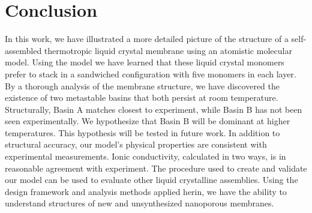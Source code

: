 \section{Conclusion}

In this work, we have illustrated a more detailed picture of the structure 
of a self-assembled thermotropic liquid crystal membrane using an atomistic 
molecular model. Using the model we have learned that these liquid crystal
monomers prefer to stack in a sandwiched configuration with five monomers
in each layer. By a thorough analysis of the membrane structure, we have
discovered the existence of two metastable basins that both persist at room
temperature. Structurally, Basin A matches closest to experiment, while 
Basin B has not been seen experimentally. We hypothesize that Basin B will
be dominant at higher temperatures. This hypothesis will be tested in future 
work. In addition to structural accuracy, our model's physical properties
are consistent with experimental measurements. Ionic conductivity, calculated
in two ways, is in reasonable agreement with experiment. The procedure used
to create and validate our model can be used to evaluate other liquid 
crystalline assemblies. Using the design framework and analysis methods 
applied herin, we have the ability to understand structures of new and
unsynthesized nanoporous membranes.
